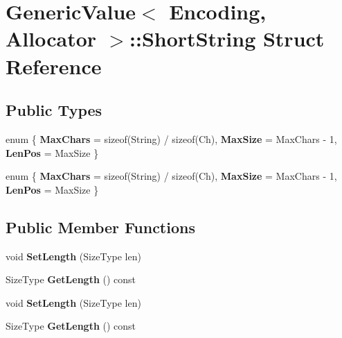 \hypertarget{structGenericValue_1_1ShortString}{}\section{Generic\+Value$<$ Encoding, Allocator $>$\+:\+:Short\+String Struct Reference}
\label{structGenericValue_1_1ShortString}
\subsection*{Public Types}
\begin{DoxyCompactItemize}
\item 
\mbox{\label{structGenericValue_1_1ShortString_aca94189325fd7f3a5cb78ab9faa6de27}} 
enum \{ {\bfseries Max\+Chars} = sizeof(String) / sizeof(Ch), 
{\bfseries Max\+Size} = Max\+Chars -\/ 1, 
{\bfseries Len\+Pos} = Max\+Size
 \}
\item 
\mbox{\label{structGenericValue_1_1ShortString_a8f25f8811cc1398112c0fb34a9dd4880}} 
enum \{ {\bfseries Max\+Chars} = sizeof(String) / sizeof(Ch), 
{\bfseries Max\+Size} = Max\+Chars -\/ 1, 
{\bfseries Len\+Pos} = Max\+Size
 \}
\end{DoxyCompactItemize}
\subsection*{Public Member Functions}
\begin{DoxyCompactItemize}
\item 
\mbox{\label{structGenericValue_1_1ShortString_adbfe8461e0cb0ccb2cb3825489e743c2}} 
void {\bfseries Set\+Length} (Size\+Type len)
\item 
\mbox{\label{structGenericValue_1_1ShortString_a4aa295331ab0d019fd64f8f5d57d450b}} 
Size\+Type {\bfseries Get\+Length} () const
\item 
\mbox{\label{structGenericValue_1_1ShortString_adbfe8461e0cb0ccb2cb3825489e743c2}} 
void {\bfseries Set\+Length} (Size\+Type len)
\item 
\mbox{\label{structGenericValue_1_1ShortString_a4aa295331ab0d019fd64f8f5d57d450b}} 
Size\+Type {\bfseries Get\+Length} () const
\end{DoxyCompactItemize}
